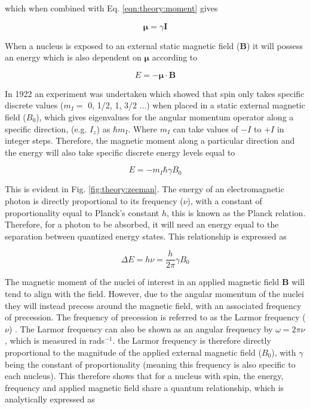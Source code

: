 \noindent which when combined with Eq. \ref{eqn:theory:moment} gives

\begin{equation}
    \boldsymbol{\mu} = \gamma \mathbf{I}
    \label{eqn:theory:moment_gyro}
\end{equation}

When a nucleus is exposed to an external static magnetic field ($\mathbf{B}$) it will possess an energy which is also dependent on $\boldsymbol\mu$ according to

\begin{equation}
    E = - \boldsymbol\mu \cdot \mathbf{B}
    \label{eqn:theory:Ebold}
\end{equation}

In 1922 an experiment was undertaken \cite{Gerlach1922DerMagnetfeld} which showed that spin only takes specific discrete values ($m_I =$ 0, 1/2, 1, 3/2 ...) when placed in a static external magnetic field ($B_0$), which gives eigenvalues for the angular momentum operator along a specific direction, (e.g. $I_z$) as $\hbar m_I$. Where $m_I$ can take values of $-I$ to $+I$ in integer steps. Therefore, the magnetic moment along a particular direction and the energy will also take specific discrete energy levels equal to

\begin{equation}
    E = -m_I\hbar \gamma B_0
    \label{eqn:theory:ESpin}
\end{equation}

This is evident in Fig. \ref{fig:theory:zeeman}. The energy of an electromagnetic photon is directly proportional to its frequency ($\nu$), with a constant of proportionality equal to Planck's constant $h$, this is known as the Planck relation. Therefore, for a photon to be absorbed, it will need an energy equal to the separation between quantized energy states. This relationship is expressed as

\begin{equation}
    \Delta E = h\nu = \frac{h}{2\pi}\gamma B_0
    \label{eqn:theory:ELamor}
\end{equation}  

The magnetic moment of the nuclei of interest in an applied magnetic field $\mathbf{B}$ will tend to align with the field. However, due to the angular momentum of the nuclei they will instead precess around the magnetic field, with an associated frequency of precession. The frequency of precession is referred to as the Larmor frequency ($\nu$) \cite{Larmor1897LXIII.Ions}. The Larmor frequency can also be shown as an angular frequency by $\omega=2\pi \nu$, which is measured in rads$^{-1}$. the Larmor frequency is therefore directly proportional to the magnitude of the applied external magnetic field ($B_0$), with $\gamma$ being the constant of proportionality (meaning this frequency is also specific to each nucleus). This therefore shows that for a nucleus with spin, the energy, frequency and applied magnetic field share a quantum relationship, which is analytically expressed as

